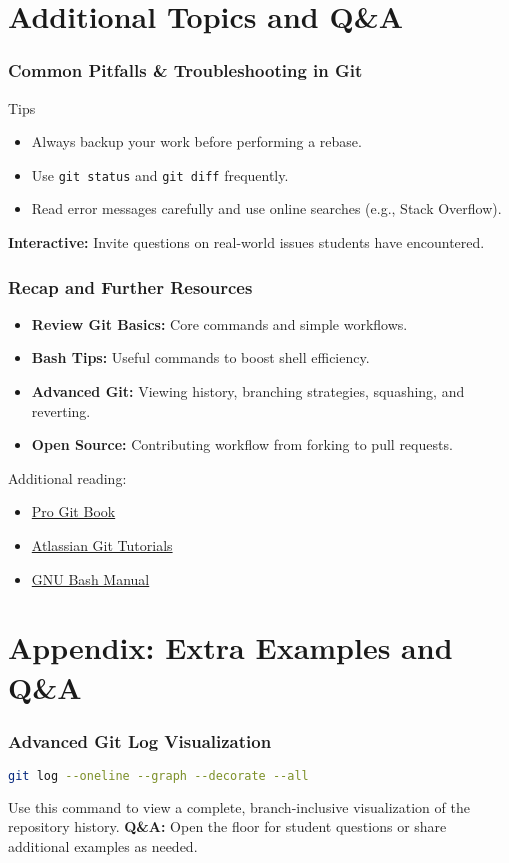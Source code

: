 \documentclass{beamer}
\begin{document}
\section{Additional Topics and Q\&A}
\begin{frame}[fragile]
	\frametitle{Common Pitfalls \& Troubleshooting in Git}
	\begin{block}{Tips}
		\begin{itemize}
			\item Always backup your work before performing a rebase.
			\item Use \texttt{git status} and \texttt{git diff} frequently.
			\item Read error messages carefully and use online searches (e.g., Stack Overflow).
		\end{itemize}
	\end{block}
	\vfill
	\pause
	\textbf{Interactive:} Invite questions on real-world issues students have encountered.
\end{frame}

\begin{frame}
	\frametitle{Recap and Further Resources}
	\begin{itemize}
		\item \textbf{Review Git Basics:} Core commands and simple workflows.
		\item \textbf{Bash Tips:} Useful commands to boost shell efficiency.
		\item \textbf{Advanced Git:} Viewing history, branching strategies, squashing, and reverting.
		\item \textbf{Open Source:} Contributing workflow from forking to pull requests.
	\end{itemize}
	\vfill
	Additional reading:
	\begin{itemize}
		\item \href{https://git-scm.com/book/en/v2}{Pro Git Book}
		\item \href{https://www.atlassian.com/git/tutorials}{Atlassian Git Tutorials}
		\item \href{https://www.gnu.org/software/bash/}{GNU Bash Manual}
	\end{itemize}
\end{frame}

\appendix
\section*{Appendix: Extra Examples and Q\&A}
\begin{frame}[fragile]
	\frametitle{Advanced Git Log Visualization}
	\begin{lstlisting}[language=bash]
  git log --oneline --graph --decorate --all
  \end{lstlisting}
	Use this command to view a complete, branch-inclusive visualization of the repository history.
	\vfill
	\pause
	\textbf{Q\&A:} Open the floor for student questions or share additional examples as needed.
\end{frame}
\end{document}
